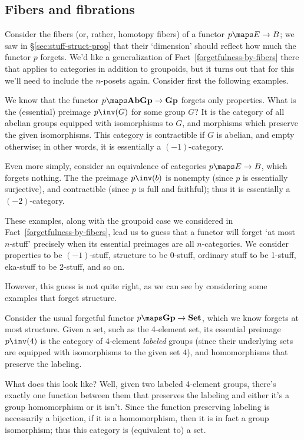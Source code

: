 \documentclass{amsart}
\begin{document}
\subsection{Fibers and fibrations}
\label{sec:fibers}

Consider the fibers (or, rather, homotopy fibers) of a functor $p\maps
E\to B$; we saw in \S\ref{sec:stuff-struct-prop} that their
`dimension' should reflect how much the functor $p$ forgets.  We'd
like a generalization of Fact~\ref{forgetfulness-by-fibers} there that
applies to categories in addition to groupoids, but it turns out that
for this we'll need to include the $n$-posets again.  Consider first
the following examples.

\begin{eg}
  We know that the functor $p\maps  \mathbf{AbGp}\to \mathbf{Gp}$ forgets
  only properties.  What is the (essential) preimage $p\inv(G)$ for
  some group $G$?  It is the category of all abelian groups equipped
  with isomorphisms to $G$, and morphisms which preserve the given
  isomorphisms.  This category is contractible if $G$ is abelian, and
  empty otherwise; in other words, it is essentially a $(-1)$-category.
\end{eg}

\begin{eg}
  Even more simply, consider an equivalence of categories $p\maps E\to B$,
  which forgets nothing.  The the preimage $p\inv(b)$ is nonempty
  (since $p$ is essentially surjective), and contractible (since $p$
  is full and faithful); thus it is essentially a $(-2)$-category.
\end{eg}

These examples, along with the groupoid case we considered in
Fact~\ref{forgetfulness-by-fibers}, lead us to guess that a functor
will forget `at most $n$-stuff' precisely when its essential preimages
are all $n$-categories.  We consider properties to be $(-1)$-stuff,
structure to be 0-stuff, ordinary stuff to be 1-stuff, eka-stuff to be
2-stuff, and so on.

However, this guess is not quite right, as we can see by considering
some examples that forget structure.

\begin{eg}
  Consider the usual forgetful functor $p\maps
  \mathbf{Gp}\to\mathbf{Set}$, which we know forgets at most
  structure.  Given a set, such as the 4-element set, its essential
  preimage $p\inv(4)$ is the category of 4-element \emph{labeled}
  groups (since their underlying sets are equipped with isomorphisms
  to the given set $4$), and homomorphisms that preserve the labeling.

  What does this look like?  Well, given two labeled 4-element groups,
  there's exactly one function between them that preserves the
  labeling and either it's a group homomorphism or it isn't.  Since
  the function preserving labeling is necessarily a bijection, if it
  is a homomorphism, then it is in fact a group isomorphism; thus this
  category is (equivalent to) a set.
\end{eg}
\end{document}
